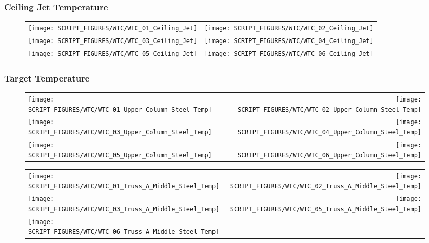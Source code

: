 \clearpage

\subsubsection{Ceiling Jet Temperature}

\begin{figure}[!ht]
\begin{tabular*}{\textwidth}{l@{\extracolsep{\fill}}r}
\texttt{[image: SCRIPT\_FIGURES/WTC/WTC\_01\_Ceiling\_Jet]} &
\texttt{[image: SCRIPT\_FIGURES/WTC/WTC\_02\_Ceiling\_Jet]} \\
\texttt{[image: SCRIPT\_FIGURES/WTC/WTC\_03\_Ceiling\_Jet]} &
\texttt{[image: SCRIPT\_FIGURES/WTC/WTC\_04\_Ceiling\_Jet]} \\
\texttt{[image: SCRIPT\_FIGURES/WTC/WTC\_05\_Ceiling\_Jet]} &
\texttt{[image: SCRIPT\_FIGURES/WTC/WTC\_06\_Ceiling\_Jet]}
\end{tabular*}
\end{figure}

\clearpage

\subsubsection{Target Temperature}

\begin{figure}[!ht]
\begin{tabular*}{\textwidth}{l@{\extracolsep{\fill}}r}
\texttt{[image: SCRIPT\_FIGURES/WTC/WTC\_01\_Upper\_Column\_Steel\_Temp]} &
\texttt{[image: SCRIPT\_FIGURES/WTC/WTC\_02\_Upper\_Column\_Steel\_Temp]} \\
\texttt{[image: SCRIPT\_FIGURES/WTC/WTC\_03\_Upper\_Column\_Steel\_Temp]} &
\texttt{[image: SCRIPT\_FIGURES/WTC/WTC\_04\_Upper\_Column\_Steel\_Temp]} \\
\texttt{[image: SCRIPT\_FIGURES/WTC/WTC\_05\_Upper\_Column\_Steel\_Temp]} &
\texttt{[image: SCRIPT\_FIGURES/WTC/WTC\_06\_Upper\_Column\_Steel\_Temp]}
\end{tabular*}
\end{figure}

\begin{figure}[!ht]
\begin{tabular*}{\textwidth}{l@{\extracolsep{\fill}}r}
\texttt{[image: SCRIPT\_FIGURES/WTC/WTC\_01\_Truss\_A\_Middle\_Steel\_Temp]} &
\texttt{[image: SCRIPT\_FIGURES/WTC/WTC\_02\_Truss\_A\_Middle\_Steel\_Temp]} \\
\texttt{[image: SCRIPT\_FIGURES/WTC/WTC\_03\_Truss\_A\_Middle\_Steel\_Temp]} &
\texttt{[image: SCRIPT\_FIGURES/WTC/WTC\_05\_Truss\_A\_Middle\_Steel\_Temp]} \\
\texttt{[image: SCRIPT\_FIGURES/WTC/WTC\_06\_Truss\_A\_Middle\_Steel\_Temp]}
\end{tabular*}
\end{figure}

